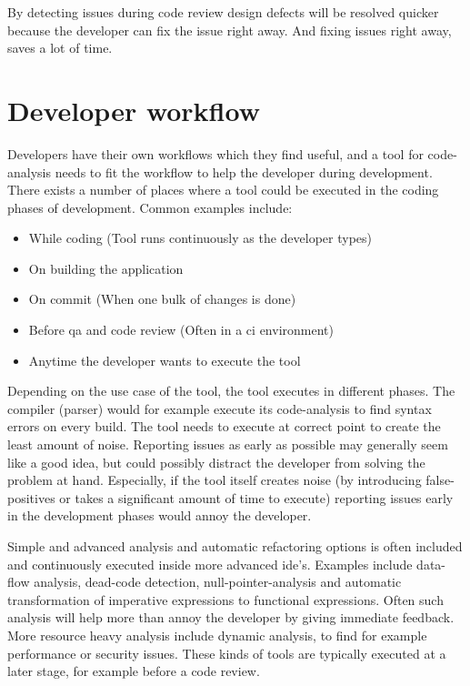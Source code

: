\documentclass{report}
\begin{document}
By detecting issues during code review design defects will be resolved quicker because the developer can fix the issue right away. And fixing issues right away, saves a lot of time.

\section{Developer workflow}

Developers have their own workflows which they find useful, and a tool for code-analysis needs to fit the workflow to help the developer during development. There exists a number of places where a tool could be executed in the coding phases of development. Common examples include:
\begin{itemize}
    \item While coding (Tool runs continuously as the developer types)
    \item On building the application 
    \item On commit (When one bulk of changes is done)
    \item Before \gls{qa} and code review (Often in a \gls{ci} environment)
    \item Anytime the developer wants to execute the tool
\end{itemize}

Depending on the use case of the tool, the tool executes in different phases. The compiler (parser) would for example execute its code-analysis to find syntax errors on every build. The tool needs to execute at correct point to create the least amount of noise. Reporting issues as early as possible may generally seem like a good idea, but could possibly distract the developer from solving the problem at hand. Especially, if the tool itself creates noise (by introducing false-positives or takes a significant amount of time to execute) reporting issues early in the development phases would annoy the developer. 

Simple and advanced analysis and automatic refactoring options is often included and continuously executed inside more advanced \gls{ide}'s. Examples include data-flow analysis, dead-code detection, null-pointer-analysis and automatic transformation of imperative expressions to functional expressions. Often such analysis will help more than annoy the developer by giving immediate feedback. More resource heavy analysis include dynamic analysis, to find for example performance or security issues. These kinds of tools are typically executed at a later stage, for example before a code review. 
\end{document}
